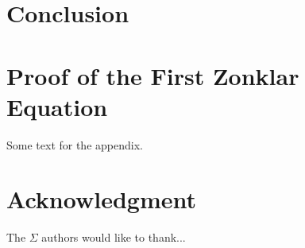 \documentclass[journal]{IEEEtran}
\begin{document}
\section{Conclusion}
\blindtext






%


\appendices
\section{Proof of the First Zonklar Equation}
Some text for the appendix.

\section*{Acknowledgment}

The $\Sigma$ authors would like to thank...


\ifCLASSOPTIONcaptionsoff
  \newpage
\fi



\end{document}
